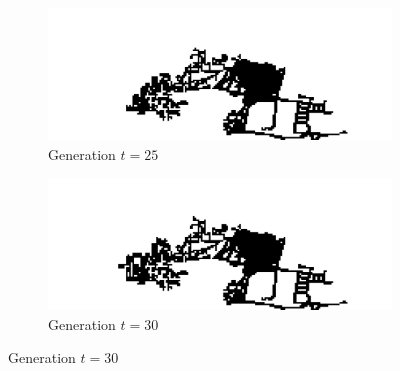 \begin{figure}[H]
\begin{multicols}{2}
\begin{subfigure}{.5\textwidth}
  \centering
  \includegraphics[width=1\linewidth]{Figures/Chapter4/generation-25-melusi}
  \caption{Generation $t = 25$}
\end{subfigure}
\begin{subfigure}{.5\textwidth}
  \centering
  \includegraphics[width=1\linewidth]{Figures/Chapter4/generation-30-melusi}
  \caption{Generation $t = 30$}
\end{subfigure}
\end{multicols}


\end{figure}

